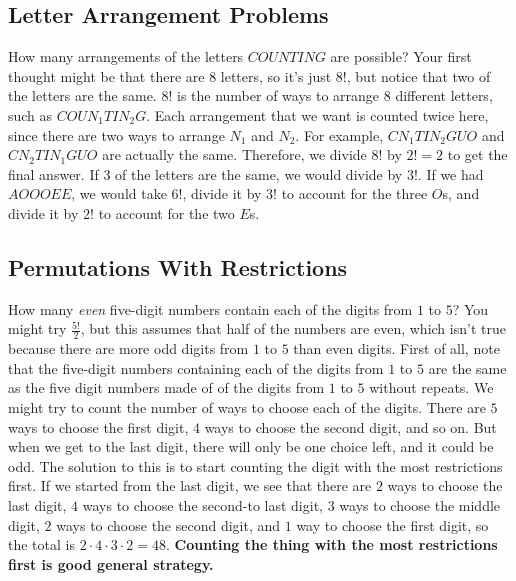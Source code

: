 \documentclass[twocolumn]{article}
\begin{document}
\subsection*{Letter Arrangement Problems}
How many arrangements of the letters $COUNTING$ are possible? Your first thought might be that there are $8$ letters, so it's just $8!$, but notice that two of the letters are the same.
$8!$ is the number of ways to arrange $8$ different letters, such as $COUN_1 TIN_2 G$.
Each arrangement that we want is counted twice here, since there are two ways to arrange $N_1$ and $N_2$.
For example, $CN_1 TIN_2 GUO$ and $CN_2 TIN_1 GUO$ are actually the same.
Therefore, we divide $8!$ by $2! = 2$ to get the final answer.
If $3$ of the letters are the same, we would divide by $3!$.
If we had $AOOOEE$, we would take $6!$, divide it by $3!$ to account for the three $O$s, and divide it by $2!$ to account for the two $E$s.

\subsection*{Permutations With Restrictions}
How many \emph{even} five-digit numbers contain each of the digits from $1$ to $5$? You might try $\frac{5!}{2}$, but this assumes that half of the numbers are even, which isn't true because there are more odd digits from $1$ to $5$ than even digits.
First of all, note that the five-digit numbers containing each of the digits from $1$ to $5$ are the same as the five digit numbers made of of the digits from $1$ to $5$ without repeats.
We might try to count the number of ways to choose each of the digits.
There are $5$ ways to choose the first digit, $4$ ways to choose the second digit, and so on.
But when we get to the last digit, there will only be one choice left, and it could be odd.
The solution to this is to start counting the digit with the most restrictions first.
If we started from the last digit, we see that there are $2$ ways to choose the last digit, $4$ ways to choose the second-to last digit, $3$ ways to choose the middle digit, $2$ ways to choose the second digit, and $1$ way to choose the first digit, so the total is $2 \cdot 4 \cdot 3 \cdot 2 = 48$.
\textbf{Counting the thing with the most restrictions first is good general strategy.}
\end{document}
